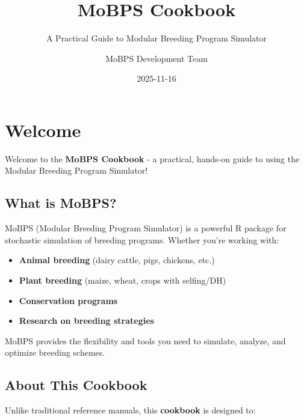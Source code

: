 \documentclass[
  letterpaper,
]{book}
\title{MoBPS Cookbook}
\subtitle{A Practical Guide to Modular Breeding Program Simulator}
\author{MoBPS Development Team}
\date{2025-11-16}
\providecommand{\tightlist}{%
  \setlength{\itemsep}{0pt}\setlength{\parskip}{0pt}}
\renewcommand*\contentsname{Table of contents}
\newcommand\contentsname{Table of contents}
\begin{document}
\frontmatter
\maketitle

\renewcommand*\contentsname{Table of contents}
{
\hypersetup{linkcolor=}
\setcounter{tocdepth}{2}
\tableofcontents
}

\mainmatter
{}

\chapter*{Welcome}\label{welcome}


Welcome to the \textbf{MoBPS Cookbook} - a practical, hands-on guide to
using the Modular Breeding Program Simulator!

\section*{What is MoBPS?}\label{what-is-mobps}


MoBPS (Modular Breeding Program Simulator) is a powerful R package for
stochastic simulation of breeding programs. Whether you're working with:

\begin{itemize}
\tightlist
\item
  \textbf{Animal breeding} (dairy cattle, pigs, chickens, etc.)
\item
  \textbf{Plant breeding} (maize, wheat, crops with selfing/DH)
\item
  \textbf{Conservation programs}
\item
  \textbf{Research on breeding strategies}
\end{itemize}

MoBPS provides the flexibility and tools you need to simulate, analyze,
and optimize breeding schemes.

\section*{About This Cookbook}\label{about-this-cookbook}


Unlike traditional reference manuals, this \textbf{cookbook} is designed
to:
\end{document}
